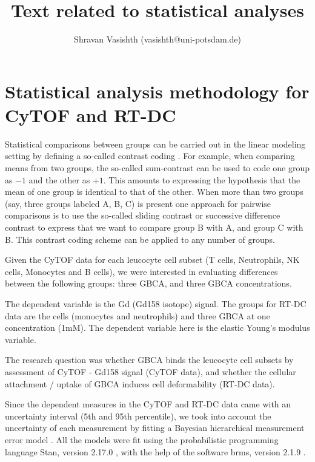 \documentclass[12pt]{article}
\title{Text related to statistical analyses}
\author{Shravan Vasishth (vasishth@uni-potsdam.de)}
\begin{document}
\maketitle

\section*{Statistical analysis methodology for CyTOF and RT-DC}

Statistical comparisons between groups can be carried out in the linear modeling setting by defining a so-called contrast coding \cite{venablesripley}. For example, when comparing means from two groups, the so-called sum-contrast can be used to  code one group as $-1$ and the other as $+1$.  This amounts to expressing the hypothesis that the mean of one group is identical to that of the other. When more than two groups (say, three groups labeled A, B, C) is present one approach for pairwise comparisons is to use the so-called sliding contrast or successive difference contrast to express that we want to compare group B with A, and group C with B. This contrast coding scheme can be applied to any number of groups. 

Given the CyTOF data for each leucocyte cell subset (T cells, Neutrophils, NK cells, Monocytes and B cells), 
we were interested in evaluating differences between the following groups: three GBCA, and three GBCA concentrations.  


The dependent variable is the Gd (Gd158 isotope) signal. The groups for RT-DC data are the cells (monocytes and neutrophils) and three GBCA at one concentration (1mM). The dependent variable here is the elastic Young's modulus variable.

The research question was whether GBCA binds the leucocyte cell subsets by assessment of CyTOF - Gd158 signal (CyTOF data), and whether the cellular attachment / uptake of GBCA induces cell deformability (RT-DC data).

Since the dependent measures in the CyTOF and RT-DC data came with an uncertainty interval (5th and 95th percentile), we took into account the uncertainty of each measurement by fitting a Bayesian hierarchical measurement error model \cite{Gelman14}. All the models were fit using the probabilistic programming language Stan, version 2.17.0 \cite{carpenter2017stan}, with the help of the software brms, version 2.1.9 \cite{brms}.  
\end{document}
